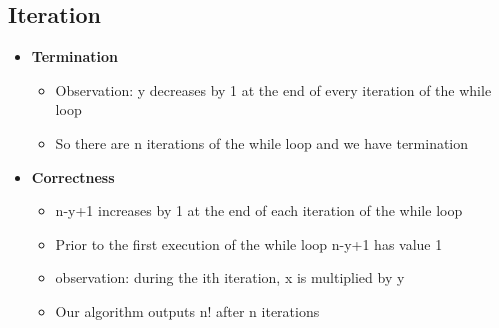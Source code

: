 \documentclass{article}[18pt]
\begin{document}
\subsection{Iteration}
\begin{itemize}
	\item \textbf{Termination}
	\begin{itemize}
		\item Observation: y decreases by 1 at the end of every iteration of the while loop
		\item So there are n iterations of the while loop and we have termination
	\end{itemize}
	\item \textbf{Correctness}
	\begin{itemize}
		\item n-y+1 increases by 1 at the end of each iteration of the while loop
		\item Prior to the first execution of the while loop n-y+1 has value 1
		\item observation: during the ith iteration, x is multiplied by y
		\item Our algorithm outputs n! after n iterations
	\end{itemize}
\end{itemize}
\end{document}
